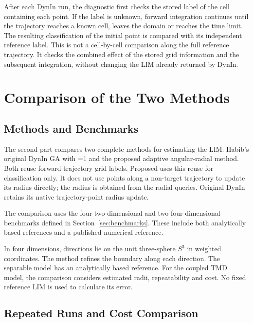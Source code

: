After each DynIn run, the diagnostic first checks the stored label of the cell containing each point. If the label is unknown, forward integration continues until the trajectory reaches a known cell, leaves the domain or reaches the time limit. The resulting classification of the initial point is compared with its independent reference label. This is not a cell-by-cell comparison along the full reference trajectory. It checks the combined effect of the stored grid information and the subsequent integration, without changing the LIM already returned by DynIn.

\section{Comparison of the Two Methods}

\subsection{Methods and Benchmarks}

\begin{revision}
The second part compares two complete methods for estimating the LIM: Habib's original DynIn GA with =1 and the proposed adaptive angular-radial method. Both reuse forward-trajectory grid labels. Proposed uses this reuse for classification only. It does not use points along a non-target trajectory to update its radius directly; the radius is obtained from the radial queries. Original DynIn retains its native trajectory-point radius update.
\end{revision}

The comparison uses the four two-dimensional and two four-dimensional benchmarks defined in Section~\ref{sec:benchmarks}. These include both analytically based references and a published numerical reference.

\begin{revision}
In four dimensions, directions lie on the unit three-sphere $S^3$ in weighted coordinates. The method refines the boundary along each direction. The separable model has an analytically based reference. For the coupled TMD model, the comparison considers estimated radii, repeatability and cost. No fixed reference LIM is used to calculate its error.
\end{revision}

\subsection{Repeated Runs and Cost Comparison}

